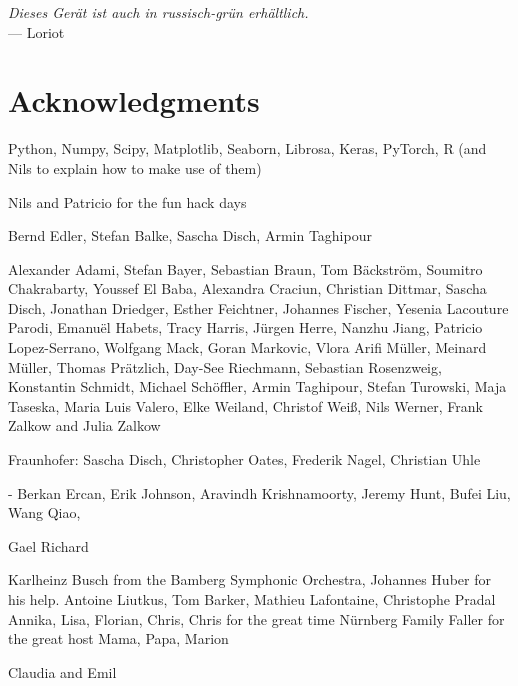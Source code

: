 
\begin{flushright}{\slshape
    Dieses Gerät ist auch in russisch-grün erhältlich.
    }\\ \medskip
    --- Loriot
\end{flushright}



\bigskip

\begingroup
\let\clearpage\relax
\let\cleardoublepage\relax
\let\cleardoublepage\relax
\chapter*{Acknowledgments}

Python, Numpy, Scipy, Matplotlib, Seaborn, Librosa, Keras, PyTorch, R (and Nils to explain how to make use of them)

Nils and Patricio for the fun hack days

Bernd Edler, Stefan Balke, Sascha Disch, Armin Taghipour

Alexander Adami, Stefan Bayer, Sebastian Braun, Tom Bäckström, Soumitro Chakrabarty, 
Youssef El Baba, Alexandra Craciun, Christian Dittmar, Sascha Disch, Jonathan Driedger, Esther Feichtner, Johannes Fischer, 
Yesenia Lacouture Parodi, Emanuël Habets, Tracy Harris, Jürgen Herre, Nanzhu Jiang, 
Patricio Lopez-Serrano, Wolfgang Mack, Goran Markovic, Vlora Arifi Müller, Meinard Müller, Thomas Prätzlich, 
Day-See Riechmann, Sebastian Rosenzweig, Konstantin Schmidt, Michael Schöffler, Armin Taghipour, 
Stefan Turowski, Maja Taseska, Maria Luis Valero, Elke Weiland, Christof Weiß, Nils Werner, 
Frank Zalkow and Julia Zalkow

Fraunhofer: Sascha Disch, Christopher Oates, Frederik Nagel, Christian Uhle

- Berkan Ercan, Erik Johnson, Aravindh Krishnamoorty, Jeremy Hunt, Bufei Liu, Wang Qiao, 





Gael Richard
\bigskip

\bigskip
Karlheinz Busch from the Bamberg Symphonic Orchestra, Johannes Huber for his help.
\bigskip
Antoine Liutkus, Tom Barker, Mathieu Lafontaine, Christophe Pradal
\bigskip
Annika, Lisa, Florian, Chris, Chris for the great time Nürnberg
\bigskip
Family Faller for the great host
Mama, Papa, Marion

\bigskip

Claudia and Emil

\endgroup
